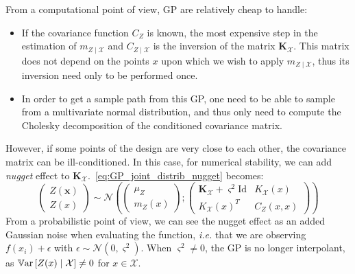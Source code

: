 \documentclass[../../Main_ManuscritThese.tex]{subfiles}
\begin{document}
From a computational point of view, GP are relatively cheap to handle:
\begin{itemize}
\item If the covariance function $C_Z$ is known, the most expensive step in the estimation of $m_{Z\mid \mathcal{X}}$ and $C_{Z \mid \mathcal{X}}$ is the inversion of the matrix $\mathbf{K}_{\mathcal{X}}$. This matrix does not depend on the points $x$ upon which we wish to apply $m_{Z\mid \mathcal{X}}$, thus its inversion need only to be performed once.
\item In order to get a sample path from this GP, one need to be able to sample from a multivariate normal distribution, and thus only need to compute the Cholesky decomposition of the conditioned covariance matrix.
\end{itemize}
However, if some points of the design are very close to each other, the covariance matrix can be ill-conditioned. In this case,
for numerical stability, we can add \emph{nugget} effect to $\mathbf{K}_{\mathcal{X}}$.~\eqref{eq:GP_joint_distrib_nugget} becomes:
\begin{equation}
  \label{eq:GP_joint_distrib_nugget}
  \begin{pmatrix}
    Z(\mathbf{x}) \\
    Z(x)
  \end{pmatrix} \sim
  \mathcal{N}\left(
    \begin{pmatrix}
      \mu_Z \\
      m_{Z}(x)
    \end{pmatrix} ;
    \begin{pmatrix}
      \mathbf{K}_{\mathcal{X}} + \varsigma^2\mathrm{Id}& K_{\mathcal{X}}(x) \\
       K_{\mathcal{X}}(x)^T & C_Z(x, x)
    \end{pmatrix}
\right)
\end{equation}
From a probabilistic point of view, we can see the nugget effect as an added Gaussian noise when evaluating the function,\emph{ i.e.} that we are observing $f(x_i)+\epsilon$ with $\epsilon \sim \mathcal{N}(0, \varsigma^2)$. When $\varsigma^2 \neq 0$, the GP is no longer interpolant, as $\mathbb{V}\mathrm{ar}\left[Z(x) \mid \mathcal{X}\right] \neq 0$ for $x\in \mathcal{X}$.
\end{document}
